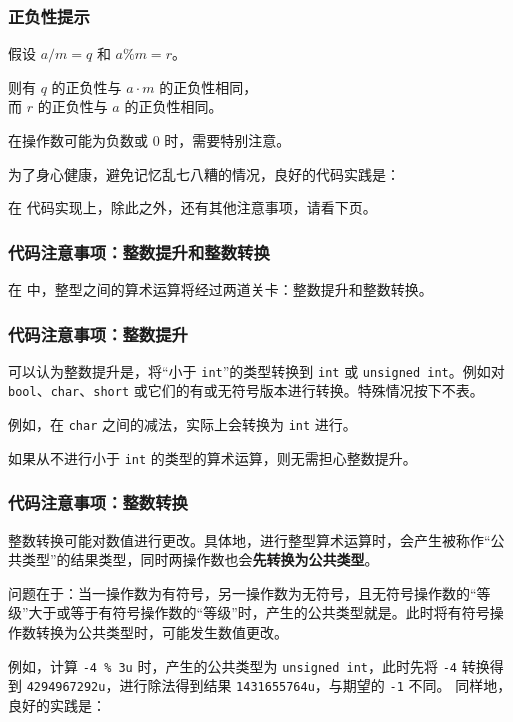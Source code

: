 \begin{frame}
  \frametitle{正负性提示}
  假设 $a \mathbin{\texttt{/}} m = q$ 和 $a \mathbin{\texttt{\%}} m = r$。
  
  则有 $q$ 的正负性与 $a \cdot m$ 的正负性相同，\\
  \-\hspace{1em}而 $r$ 的正负性与 $a$ 的正负性相同。
  
  \emptyline
  在操作数可能为负数或 $0$ 时，需要特别注意。
  \pause
  
  \emptyline
  为了身心健康，避免记忆乱七八糟的情况，良好的代码实践是：
  \begin{center}
  \end{center}
  \pause
  
  在 \Cpp{} 代码实现上，除此之外，还有其他注意事项，请看下页。
\end{frame}
\begin{frame}
  \frametitle{\textbf{代码注意事项}：整数提升和整数转换}
  在 \Cpp{} 中，整型之间的算术运算将经过两道关卡：\alert{整数提升}和\alert{整数转换}。
\end{frame}
\begin{frame}
  \frametitle{\textbf{代码注意事项}：整数提升}
  可以认为\alert{整数提升}是，将“小于 \texttt{int}”的类型转换到 \texttt{int} 或 \texttt{unsigned int}。例如对 \texttt{bool}、\texttt{char}、\texttt{short} 或它们的有或无符号版本进行转换。特殊情况按下不表。
  
  \emptyline
  例如，在 \texttt{char} 之间的减法，实际上会转换为 \texttt{int} 进行。
  
  \emptyline
  如果从不进行小于 \texttt{int} 的类型的算术运算，则无需担心整数提升。
\end{frame}
\begin{frame}
  \frametitle{\textbf{代码注意事项}：整数转换}
  \alert{整数转换}可能对数值进行更改。具体地，进行整型算术运算时，会产生被称作“\alert{公共类型}”的结果类型，同时两操作数也会\textbf{先转换为公共类型}。
  
  \emptyline
  问题在于：当一操作数为有符号，另一操作数为无符号，且无符号操作数的“等级”大于或等于有符号操作数的“等级”时，产生的公共类型就是。此时将有符号操作数转换为公共类型时，可能发生数值更改。
  \pause
  
  \emptyline
  例如，计算 \texttt{-4 \% 3u} 时，产生的公共类型为 \texttt{unsigned int}，此时先将 \texttt{-4} 转换得到 \texttt{4294967292u}，进行除法得到结果 \texttt{1431655764u}，与期望的 \texttt{-1} 不同。
  \pause
  同样地，良好的实践是：
  \begin{center}
  \end{center}
\end{frame}
